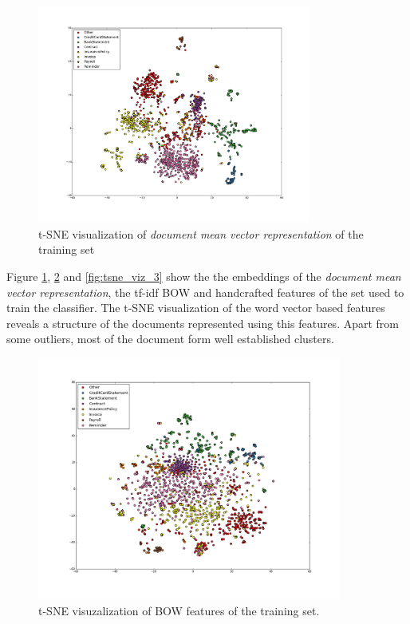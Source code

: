 \begin{figure}[ht!]
	\begin{center}

			\includegraphics[width=0.8\textwidth]{images/tse-document-mean-vectors.pdf} 

	\end{center}
	\caption{\ac{t-SNE} visualization of \textit{document mean
           vector representation} of the training set}
	\label{fig:tsne_viz_1}
\end{figure}

Figure \ref{fig:tsne_viz_1}, \ref{fig:tsne_viz_2} and \ref{fig:tsne_viz_3}
show the the embeddings of the \textit{document mean vector representation},
the \ac{tf-idf} \ac{BOW}  and handcrafted features of the  set used
to train the classifier. The \ac{t-SNE} visualization of the word vector
based features reveals a structure of the documents represented using this
features. Apart from some outliers, most of the document form
well established clusters.


\begin{figure}[ht!]
	\begin{center}

			\includegraphics[width=10cm]{images/tse-tfidf-vectors.png} 

	\end{center}
        \caption{\ac{t-SNE} visuzalization of \ac{BOW} features of the training set.  }

	\label{fig:tsne_viz_2}
\end{figure}
 
